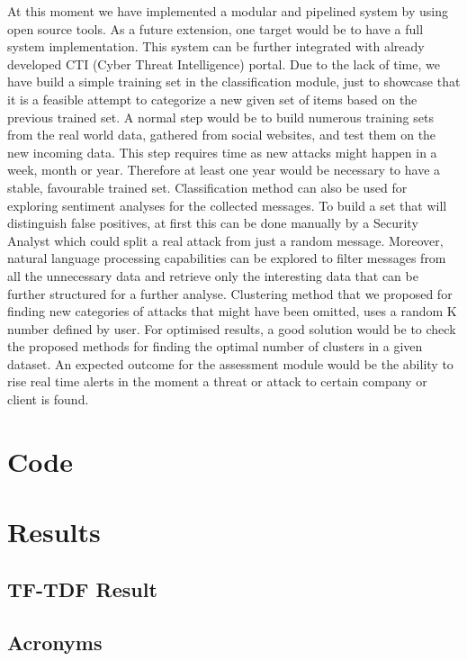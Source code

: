 \documentclass[12pt]{article}
\begin{document}
At this moment we have implemented a modular and pipelined system by using open source tools. As a future extension, one target would be to have a full system implementation. This system can be further integrated with already developed CTI (Cyber Threat Intelligence) portal. Due to the lack of time, we have build a simple training set in the classification module, just to showcase that it is a feasible attempt to categorize a new given set of items based on the previous trained set. A normal step would be to build numerous training sets from the real world data, gathered from social websites, and test them on the new incoming data. This step requires time as new attacks might happen in a week, month or year. Therefore at least one year would be necessary to have a stable, favourable trained set. Classification method can also be used for exploring sentiment analyses for the collected messages. To build a set that will distinguish false positives, at first this can be done manually by a Security Analyst which could split a real attack from just a random message. Moreover, natural language processing capabilities can be explored to filter messages from all the unnecessary data and retrieve only the interesting data that can be further structured for a further analyse. Clustering method that we proposed for finding new categories of attacks that might have been omitted, uses a random K number defined by user. For optimised results, a good solution would be to check the proposed methods for finding the optimal number of clusters in a given dataset. An expected outcome for the assessment module would be the ability to rise real time alerts in the moment a threat or attack to certain company or client is found.



\newpage
\begin{appendices}
\section{Code}
\section{Results}
\subsection{TF-TDF Result} \label{tf-idf-apendix}

\end{appendices}

\subsection{Acronyms}
\end{document}
